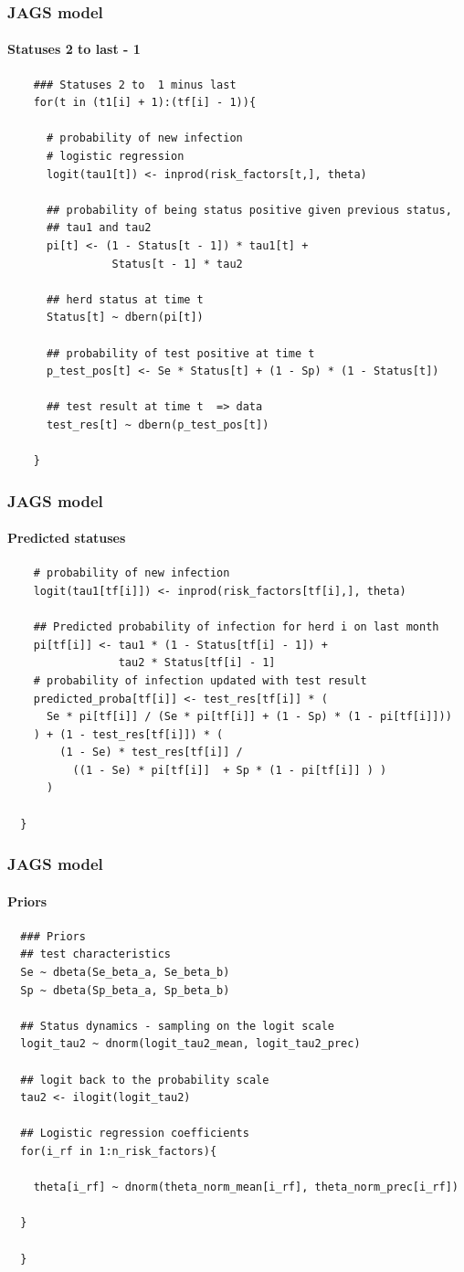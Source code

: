 \documentclass{beamer}
\begin{document}
\begin{frame}[fragile]
\frametitle{JAGS model}
\framesubtitle{Statuses 2 to last - 1}
\scriptsize
\begin{verbatim}
    ### Statuses 2 to  1 minus last
    for(t in (t1[i] + 1):(tf[i] - 1)){
      
      # probability of new infection
      # logistic regression
      logit(tau1[t]) <- inprod(risk_factors[t,], theta)
      
      ## probability of being status positive given previous status,
      ## tau1 and tau2
      pi[t] <- (1 - Status[t - 1]) * tau1[t] +
                Status[t - 1] * tau2
      
      ## herd status at time t
      Status[t] ~ dbern(pi[t])
      
      ## probability of test positive at time t
      p_test_pos[t] <- Se * Status[t] + (1 - Sp) * (1 - Status[t])
      
      ## test result at time t  => data
      test_res[t] ~ dbern(p_test_pos[t])
      
    }
 \end{verbatim}
\end{frame}

\begin{frame}[fragile]
\frametitle{JAGS model}
\framesubtitle{Predicted statuses}
\scriptsize
\begin{verbatim}
    # probability of new infection
    logit(tau1[tf[i]]) <- inprod(risk_factors[tf[i],], theta)
    
    ## Predicted probability of infection for herd i on last month
    pi[tf[i]] <- tau1 * (1 - Status[tf[i] - 1]) + 
                 tau2 * Status[tf[i] - 1]
    # probability of infection updated with test result
    predicted_proba[tf[i]] <- test_res[tf[i]] * (  
      Se * pi[tf[i]] / (Se * pi[tf[i]] + (1 - Sp) * (1 - pi[tf[i]]))
    ) + (1 - test_res[tf[i]]) * (                  
        (1 - Se) * test_res[tf[i]] /
          ((1 - Se) * pi[tf[i]]  + Sp * (1 - pi[tf[i]] ) )
      )
    
  }
\end{verbatim}
\end{frame}

\begin{frame}[fragile]
\frametitle{JAGS model}
\framesubtitle{Priors}
\scriptsize
\begin{verbatim}
  ### Priors
  ## test characteristics
  Se ~ dbeta(Se_beta_a, Se_beta_b)
  Sp ~ dbeta(Sp_beta_a, Sp_beta_b)

  ## Status dynamics - sampling on the logit scale
  logit_tau2 ~ dnorm(logit_tau2_mean, logit_tau2_prec)

  ## logit back to the probability scale
  tau2 <- ilogit(logit_tau2)
  
  ## Logistic regression coefficients
  for(i_rf in 1:n_risk_factors){
    
    theta[i_rf] ~ dnorm(theta_norm_mean[i_rf], theta_norm_prec[i_rf])
    
  }
  
  }
\end{verbatim}
\end{frame}
\end{document}
